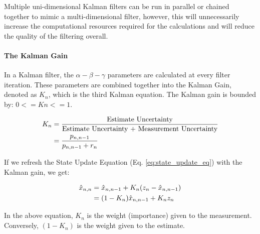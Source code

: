         Multiple uni-dimensional Kalman filters can be run in parallel or chained together to mimic a multi-dimensional filter, however, this will unnecessarily increase the computational resources required for the calculations and will reduce the quality of the filtering overall.

        \paragraph*{The Kalman Gain} In a Kalman filter, the $\alpha-\beta-\gamma$ parameters are calculated at every filter iteration.
        These parameters are combined together into the Kalman Gain, denoted as $K_n$, which is the third Kalman equation.
        The Kalman gain is bounded by: $0 <= Kn <= 1$.

        \begin{equation} \labeq{kalman_gain}
            \begin{aligned}
                K_n &= \frac{\text{Estimate Uncertainty}}{\text{Estimate Uncertainty + Measurement Uncertainty}} \\
                    &= \frac{p_{n,n-1}}{p_{n,n-1} + r_n}
            \end{aligned}
        \end{equation}

        If we refresh the State Update Equation (Eq. \ref{eq:state_update_eq}) with the Kalman gain, we get:

        \begin{equation} \labeq{kalman_state_update_eq}
            \begin{aligned}
                \hat{x}_{n,n} &= \hat{x}_{n,n-1} + K_n(z_n - \hat{x}_{n,n-1}) \\
                              &= (1-K_n)\hat{x}_{n,n-1} + K_n z_n \\
            \end{aligned}
        \end{equation}

        In the above equation, $K_n$ is the weight (importance) given to the measurement.
        Conversely, $(1-K_n)$ is the weight given to the estimate.


